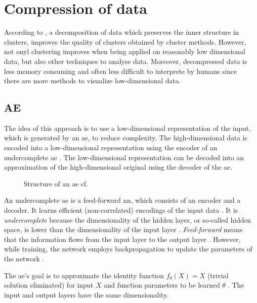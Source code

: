 \section{Compression of data}\label{subsec:compression}

According to \citeauthor{clusteringDocs2020}, a decomposition of data which preserves the inner structure in clusters, 
improves the quality of clusters obtained by cluster methods.
However, not onyl clustering improves when being applied on reasonably low dimensional data, but also other techniques to analyse data.
Moreover, decompressed data is less memory consuming and often less difficult to interprete by humans 
since there are more methods to visualize low-dimensional data.

\subsection{AE}\label{subsec:autoencoder}

The idea of this approach is to use a low-dimensional representation of the input, which is generated by an \ac{ae}, to reduce complexity.
The high-dimensional data is encoded into a low-dimensional representation using the encoder of an undercomplete \ac{ae} \cite{autoencoder2020}.
The low-dimensional representation can be decoded into an approximation of the high-dimensional original using the decoder of the \ac{ae}.

\begin{figure}[h] %
    \centering
    
    \caption{Structure of an \ac{ae} cf. \cite{autoencoder2020}}
    \label{fig:ae}
\end{figure}

An undercomplete \ac{ae} is a feed-forward \ac{nn}, which consists of an encoder and a decoder.
It learns efficient (non-correlated) encodings of the input data \cite{autoencoder2020}.
It is \textit{undercomplete} because the dimensionality of the hidden layer, or so-called hidden space, 
is lower than the dimensionality of the input layer \cite{seminar_ies}.
\textit{Feed-forward} means that the information flows from the input layer to the output layer \cite{seminar_ies}.
However, while training, the network employs backpropagation to update the parameters of the network \cite{seminar_ies}.

The \ac{ae}'s goal is to approximate the identity function $f_\theta(X) = X$ (trivial solution eliminated) for input $X$ and 
function parameters to be learned $\theta$ \cite{seminar_ies}.
The input and output layers have the same dimensionality.

